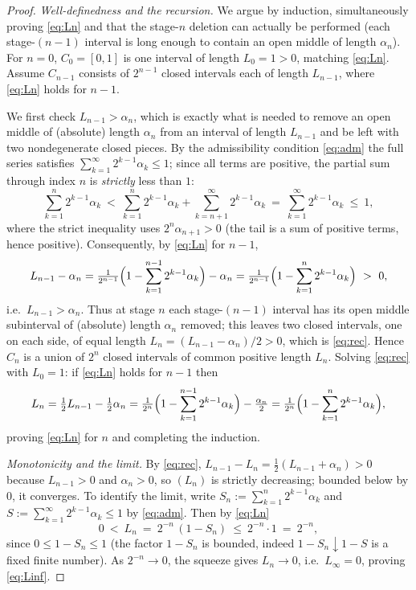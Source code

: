 \documentclass{amsart}
\theoremstyle{definition}
\theoremstyle{remark}
\begin{document}
\begin{proof}
\emph{Well-definedness and the recursion.}
We argue by induction, simultaneously proving \eqref{eq:Ln} and that the stage-$n$
deletion can actually be performed (each stage-$(n-1)$ interval is long enough to
contain an open middle of length $\alpha_n$). For $n=0$, $C_0=[0,1]$ is one
interval of length $L_0=1>0$, matching \eqref{eq:Ln}. Assume $C_{n-1}$ consists of
$2^{n-1}$ closed intervals each of length $L_{n-1}$, where \eqref{eq:Ln} holds for
$n-1$.

We first check $L_{n-1}>\alpha_n$, which is exactly what is needed to remove an open
middle of (absolute) length $\alpha_n$ from an interval of length $L_{n-1}$ and be
left with two nondegenerate closed pieces. By the admissibility condition
\eqref{eq:adm} the full series satisfies $\sum_{k=1}^{\infty}2^{k-1}\alpha_k\le1$;
since all terms are positive, the partial sum through index $n$ is \emph{strictly}
less than $1$:
\[
\sum_{k=1}^{n}2^{k-1}\alpha_k
\ <\ \sum_{k=1}^{n}2^{k-1}\alpha_k+\sum_{k=n+1}^{\infty}2^{k-1}\alpha_k
\ =\ \sum_{k=1}^{\infty}2^{k-1}\alpha_k\ \le\ 1,
\]
where the strict inequality uses $2^{n}\alpha_{n+1}>0$ (the tail is a sum of
positive terms, hence positive). Consequently, by \eqref{eq:Ln} for $n-1$,
\[
L_{n-1}-\alpha_n
=\tfrac1{2^{n-1}}\Bigl(1-\sum_{k=1}^{n-1}2^{k-1}\alpha_k\Bigr)-\alpha_n
=\tfrac1{2^{n-1}}\Bigl(1-\sum_{k=1}^{n}2^{k-1}\alpha_k\Bigr)\ >\ 0,
\]
i.e.\ $L_{n-1}>\alpha_n$. Thus at stage $n$ each stage-$(n-1)$ interval has its open
middle subinterval of (absolute) length $\alpha_n$ removed; this leaves two closed
intervals, one on each side, of equal length $L_n=(L_{n-1}-\alpha_n)/2>0$, which is
\eqref{eq:rec}. Hence $C_n$ is a union of $2^{n}$ closed intervals of common
positive length $L_n$. Solving \eqref{eq:rec} with $L_0=1$: if \eqref{eq:Ln} holds
for $n-1$ then
\[
L_n=\tfrac12 L_{n-1}-\tfrac12\alpha_n
=\tfrac{1}{2^{n}}\Bigl(1-\sum_{k=1}^{n-1}2^{k-1}\alpha_k\Bigr)-\tfrac{\alpha_n}{2}
=\tfrac{1}{2^{n}}\Bigl(1-\sum_{k=1}^{n}2^{k-1}\alpha_k\Bigr),
\]
proving \eqref{eq:Ln} for $n$ and completing the induction.

\smallskip
\emph{Monotonicity and the limit.}
By \eqref{eq:rec}, $L_{n-1}-L_n=\tfrac12(L_{n-1}+\alpha_n)>0$ because $L_{n-1}>0$ and
$\alpha_n>0$, so $(L_n)$ is strictly decreasing; bounded below by $0$, it converges.
To identify the limit, write $S_n:=\sum_{k=1}^{n}2^{k-1}\alpha_k$ and
$S:=\sum_{k=1}^{\infty}2^{k-1}\alpha_k\le1$ by \eqref{eq:adm}. Then by \eqref{eq:Ln}
\[
0\ <\ L_n\ =\ 2^{-n}\,(1-S_n)\ \le\ 2^{-n}\cdot 1\ =\ 2^{-n},
\]
since $0\le 1-S_n\le 1$ (the factor $1-S_n$ is bounded, indeed $1-S_n\downarrow 1-S$
is a fixed finite number). As $2^{-n}\to0$, the squeeze gives $L_n\to0$, i.e.\
$L_\infty=0$, proving \eqref{eq:Linf}.
\end{proof}
\end{document}
